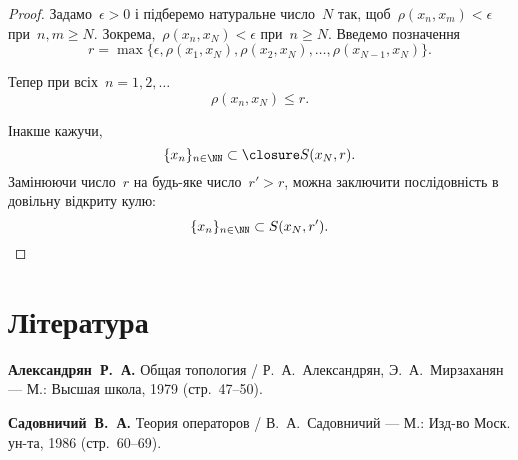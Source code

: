 \begin{proof}
Задамо~$\epsilon > 0$ і підберемо натуральне число~$N$
так, щоб~$\rho(x_n, x_m) < \epsilon$ при~$n, m \ge N$.
Зокрема,~$\rho(x_n, x_N) < \epsilon$ при~$n \ge N$.
Введемо позначення
\begin{equation*}
    r = \max \{ \epsilon, \rho(x_1, x_N), \rho(x_2, x_N), \dots, \rho(x_{N - 1}, x_N) \}.
\end{equation*}

Тепер при всіх~$n = 1, 2, \dots$
\begin{equation*}
    \rho(x_n, x_N) \le r.
\end{equation*}

Інакше кажучи,
\begin{equation*}
    \{x_n\}_{n \in \NN} \subset \closure S(x_N, r).
\end{equation*}
Замінюючи число~$r$ на будь-яке число~$r' > r$, можна
заключити послідовність в довільну відкриту кулю:
\begin{equation*}
    \{x_n\}_{n \in \NN} \subset S(x_N, r'). \qedhere
\end{equation*}
\end{proof}

\section{Література}

\begin{enumerate}[label={[\arabic*]}]
\item \textbf{Александрян~Р.~А.}
Общая топология /
Р.~А.~Александрян, Э.~А.~Мирзаханян ---
М.: Высшая школа, 1979 (стр.~47--50).
\item \textbf{Садовничий~В.~А.}
Теория операторов /
В.~А.~Садовничий ---
М.: Изд-во Моск. ун-та, 1986 (стр.~60--69).
\end{enumerate}

